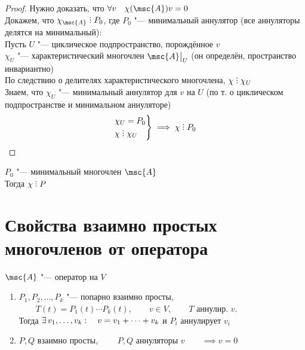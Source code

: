 \begin{proof}
	Нужно доказать, что $ \forall v \quad \chi(\msc{A})v = 0 $ \\
	Докажем, что $ \chi_{\msc{A}} \divby P_0 $, где $ P_0 $ "--- минимальный аннулятор (все аннуляторы делятся на минимальный): \\
	Пусть $ U $ "--- циклическое подпространство, порождённое $ v $ \\
	$ \chi_U $ "--- характеристический многочлен $ \msc{A}\clamp{U} $ (он определён, \as пространство инвариантно) \\
	По следствию о делителях характеристического многочлена, $ \chi \divby \chi_U $ \\
	Знаем, что $ \chi_U $ "--- минимальный аннулятор для $ v $ на $ U $ (по т. о циклическом подпространстве и минимальном аннуляторе)
	$$
	\begin{rcases}
		\chi_U = P_0 \\
		\chi \divby \chi_U
	\end{rcases} \implies \chi \divby P_0 $$
\end{proof}

\begin{implication}
	$ P_0 $ "--- минимальный многочлен $ \msc{A} $ \\
	Тогда $ \chi \divby P $
\end{implication}

\section{Свойства взаимно простых многочленов от оператора}

\begin{properties}
	$ \msc{A} $ "--- оператор на $ V $
	\begin{enumerate}
		\item $ P_1, P_2, \dots, P_k $ "--- попарно взаимно просты, $ \qquad T(t) = P_1(t) \cdots P_k(t), \qquad v \in V, \qquad T $ аннулир. $ v $. \\
		Тогда $ \exists\, v_1, \dots, v_k : \quad v = v_1 + \dots + v_k $ и $ P_i $ аннулирует $ v_i $

		\item $ P, Q $ взаимно просты, $ \qquad P, Q $ аннуляторы $ v \qquad \implies v = 0 $
	\end{enumerate}
\end{properties}

